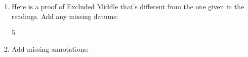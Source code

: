 \begin{enumerate}
\begin{enumerate}
	\end{enumerate}

 \item Here is a proof of Excluded Middle that's different from the one given in 
  the readings. Add any missing datums:



\begin{argumentN}[1]












{5}







\end{argumentN}

\newpage


 \item Add missing annotations:


\begin{argumentN}[1]


\end{argumentN}
\end{enumerate}

